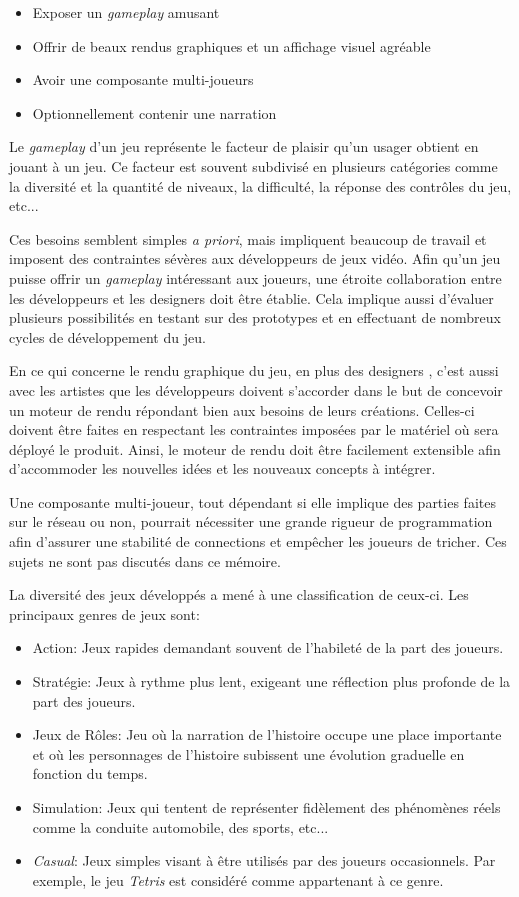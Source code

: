 \documentclass[12pt,twoside,letterpaper,francais]{book}
\begin{document}
\begin{itemize}
\item Exposer un \textit{gameplay} amusant
\item Offrir de beaux rendus graphiques et un affichage visuel
  agréable
\item Avoir une composante multi-joueurs
\item Optionnellement contenir une narration 
\end{itemize}

Le \textit{gameplay} d'un jeu représente le facteur de plaisir qu'un
usager obtient en jouant à un jeu. Ce facteur est souvent subdivisé en
plusieurs catégories comme la diversité et la quantité de niveaux, la
difficulté, la réponse des contrôles du jeu, etc...

Ces besoins semblent simples \textit{a priori}, mais impliquent
beaucoup de travail et imposent des contraintes sévères aux
développeurs de jeux vidéo. Afin qu'un jeu puisse offrir un
\textit{gameplay} intéressant aux joueurs, une étroite collaboration
entre les développeurs et les designers doit être établie. Cela
implique aussi d'évaluer plusieurs possibilités en testant sur des
prototypes et en effectuant de nombreux cycles de développement du
jeu.

En ce qui concerne le rendu graphique du jeu, en plus des designers ,
c'est aussi avec les artistes que les développeurs doivent s'accorder
dans le but de concevoir un moteur de rendu répondant bien aux besoins
de leurs créations. Celles-ci doivent être faites en respectant les
contraintes imposées par le matériel où sera déployé le
produit. Ainsi, le moteur de rendu doit être facilement extensible
afin d'accommoder les nouvelles idées et les nouveaux concepts à
intégrer.

Une composante multi-joueur, tout dépendant si elle implique des
parties faites sur le réseau ou non, pourrait nécessiter une grande
rigueur de programmation afin d'assurer une stabilité de connections et
empêcher les joueurs de tricher. Ces sujets ne sont pas discutés dans
ce mémoire.

La diversité des jeux développés a mené à une classification de
ceux-ci. Les principaux genres de jeux sont:

\begin{itemize}
\item Action: Jeux rapides demandant souvent de l'habileté de la part
  des joueurs.
\item Stratégie: Jeux à rythme plus lent, exigeant une réflection plus
  profonde de la part des joueurs.
\item Jeux de Rôles: Jeu où la narration de l'histoire occupe une
  place importante et où les personnages de l'histoire subissent une
  évolution graduelle en fonction du temps.
\item Simulation: Jeux qui tentent de représenter fidèlement des
  phénomènes réels comme la conduite automobile, des sports, etc...
\item \textit{Casual}: Jeux simples visant à être utilisés par des
  joueurs occasionnels. Par exemple, le jeu \textit{Tetris} est
  considéré comme appartenant à ce genre.
\end{itemize}
\end{document}
